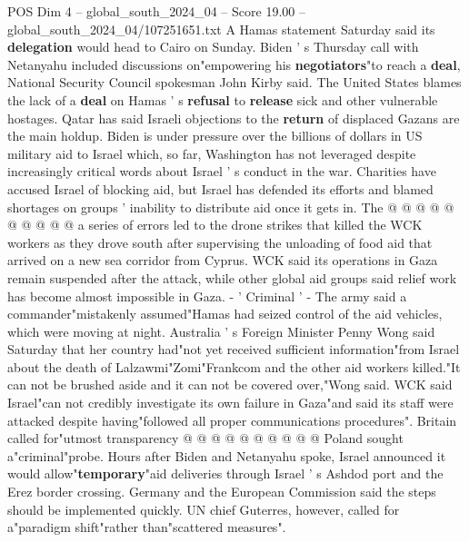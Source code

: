 \begin{textsample}{POS Dim 4 – global\_south\_2024\_04 – Score 19.00 – global\_south\_2024\_04/107251651.txt}
A Hamas statement Saturday said its \textbf{delegation} would head to Cairo on Sunday.
Biden ' s Thursday call with Netanyahu included discussions on"empowering his \textbf{negotiators}"to reach a \textbf{deal}, National Security Council spokesman John Kirby said.
The United States blames the lack of a \textbf{deal} on Hamas ' s \textbf{refusal} to \textbf{release} sick and other vulnerable hostages.
Qatar has said Israeli objections to the \textbf{return} of displaced Gazans are the main holdup.
Biden is under pressure over the billions of dollars in US military aid to Israel which, so far, Washington has not leveraged despite increasingly critical words about Israel ' s conduct in the war.
Charities have accused Israel of blocking aid, but Israel has defended its efforts and blamed shortages on groups ' inability to distribute aid once it gets in.
The @ @ @ @ @ @ @ @ @ @ a series of errors led to the drone strikes that killed the WCK workers as they drove south after supervising the unloading of food aid that arrived on a new sea corridor from Cyprus.
WCK said its operations in Gaza remain suspended after the attack, while other global aid groups said relief work has become almost impossible in Gaza. - ' Criminal ' - The army said a commander"mistakenly assumed"Hamas had seized control of the aid vehicles, which were moving at night.
Australia ' s Foreign Minister Penny Wong said Saturday that her country had"not yet received sufficient information"from Israel about the death of Lalzawmi"Zomi"Frankcom and the other aid workers killed."It can not be brushed aside and it can not be covered over,"Wong said.
WCK said Israel"can not credibly investigate its own failure in Gaza"and said its staff were attacked despite having"followed all proper communications procedures".
Britain called for"utmost transparency @ @ @ @ @ @ @ @ @ @ Poland sought a"criminal"probe.
Hours after Biden and Netanyahu spoke, Israel announced it would allow"\textbf{temporary}"aid deliveries through Israel ' s Ashdod port and the Erez border crossing.
Germany and the European Commission said the steps should be implemented quickly.
UN chief Guterres, however, called for a"paradigm shift"rather than"scattered measures".

\end{textsample}
